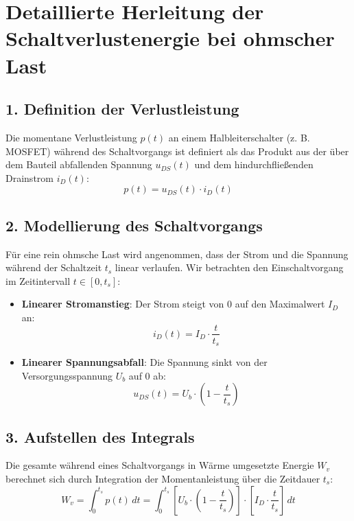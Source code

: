 \documentclass{article}
\begin{document}
\section*{Detaillierte Herleitung der Schaltverlustenergie bei ohmscher Last}

\subsection*{1. Definition der Verlustleistung}
Die momentane Verlustleistung $p(t)$ an einem Halbleiterschalter (z. B. MOSFET) während des Schaltvorgangs ist definiert als das Produkt aus der über dem Bauteil abfallenden Spannung $u_{DS}(t)$ und dem hindurchfließenden Drainstrom $i_D(t)$:
\begin{equation}
p(t) = u_{DS}(t) \cdot i_D(t)
\end{equation}

\subsection*{2. Modellierung des Schaltvorgangs}
Für eine rein ohmsche Last wird angenommen, dass der Strom und die Spannung während der Schaltzeit $t_s$ linear verlaufen. Wir betrachten den Einschaltvorgang im Zeitintervall $t \in [0, t_s]$:

\begin{itemize}
    \item \textbf{Linearer Stromanstieg}: Der Strom steigt von $0$ auf den Maximalwert $I_D$ an:
    \begin{equation}
    i_D(t) = I_D \cdot \frac{t}{t_s}
    \end{equation}
    
    \item \textbf{Linearer Spannungsabfall}: Die Spannung sinkt von der Versorgungsspannung $U_b$ auf $0$ ab:
    \begin{equation}
    u_{DS}(t) = U_b \cdot \left( 1 - \frac{t}{t_s} \right)
    \end{equation}
\end{itemize}



\subsection*{3. Aufstellen des Integrals}
Die gesamte während eines Schaltvorgangs in Wärme umgesetzte Energie $W_v$ berechnet sich durch Integration der Momentanleistung über die Zeitdauer $t_s$:
\begin{equation}
W_v = \int_{0}^{t_s} p(t) \, dt = \int_{0}^{t_s} \left[ U_b \cdot \left( 1 - \frac{t}{t_s} \right) \right] \cdot \left[ I_D \cdot \frac{t}{t_s} \right] \, dt
\end{equation}
\end{document}
